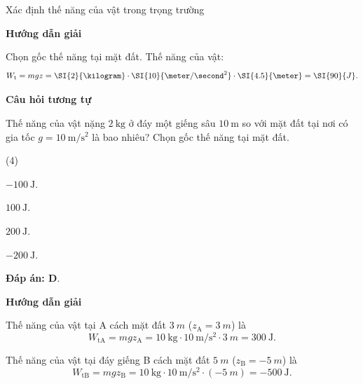 \begin{dang}{Xác định thế năng của vật trong trọng trường}
	{	\begin{center}
			\textbf{Hướng dẫn giải}
		\end{center}
		Chọn gốc thế năng tại mặt đất. Thế năng của vật:
		$$W_\text t = mgz = \SI{2}{\kilogram}\cdot\SI{10}{\meter/\second^2}\cdot\SI{4.5}{\meter}=\SI{90}{J}.$$
		
		\begin{center}
			\textbf{Câu hỏi tương tự}
		\end{center}
		
		Thế năng của vật nặng $\SI{2}{\kilogram}$ ở đáy một giếng sâu $\SI{10}{\meter}$ so với mặt đất tại nơi có gia tốc $g= \SI{10}{\meter/\second^2}$ là bao nhiêu? Chọn gốc thế năng tại mặt đất.
		\begin{mcq}(4)
			\item $\SI{-100}{\joule}$.
			\item $\SI{100}{\joule}$.
			\item $\SI{200}{\joule}$.
			\item $\SI{-200}{\joule}$. 
		\end{mcq}
		
		\textbf{Đáp án: D}.
	}
	{	\begin{center}
			\textbf{Hướng dẫn giải}
		\end{center}
		
		Thế năng của vật tại A cách mặt đất $\SI{3}{m}$ ($z_\text{A}=\SI{3}{m}$) là
		\begin{equation*}
			W_{\text{tA}}=mgz_\text{A}=\SI{10}{\kilogram}\cdot\SI{10}{\meter/\second^2}\cdot\SI{3}{m}=\SI{300}{\joule}.
		\end{equation*}
		
		Thế năng của vật tại đáy giếng B cách mặt đất $\SI{5}{m}$ ($z_\text{B}=-\SI{5}{m}$) là
		\begin{equation*}
			W_{\text{tB}}=mgz_\text{B}=\SI{10}{\kilogram}\cdot\SI{10}{\meter/\second^2}\cdot(-\SI{5}{m})=\SI{-500}{\joule}.
		\end{equation*}
		
}
\end{dang}
